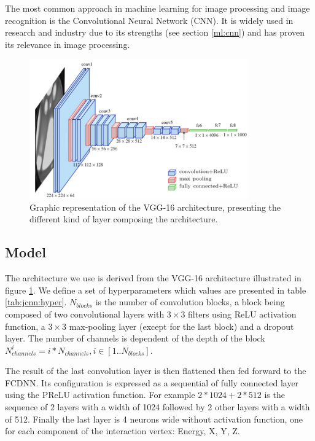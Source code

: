 The most common approach in machine learning for image processing and image recognition is the Convolutional Neural Network (CNN). It is widely used in research and industry \cite{simonyan_very_2015, ciresan_multi-column_2012, abbasi_convolutional_2021, maksimovic_cnns_2021} due to its strengths (see section \ref{ml:cnn}) and has proven its relevance in image processing.

\begin{figure}[ht]
  \centering
  \includegraphics[height=6cm]{images/jcnn/vgg16.png}
  \caption{Graphic representation of the VGG-16 architecture, presenting the different kind of layer composing the architecture.}
  \label{fig:jcnn:vgg16}
\end{figure}

\subsection{Model}
\label{sec:jcnn:model}

The architecture we use is derived from the VGG-16 architecture \cite{simonyan_very_2015} illustrated in figure \ref{fig:jcnn:vgg16}. We define a set of hyperparameters which values are presented in table \ref{tab:jcnn:hyper}. $N_{blocks}$ is the number of convolution blocks, a block being composed of two convolutional layers with $3\times3$ filters using ReLU activation function, a $3\times3$ max-pooling layer (except for the last block) and a dropout layer. The number of channels is dependent of the depth of the block $N^i_{channels} = i * N_{channels}, i \in [1..N_{blocks}]$.

The result of the last convolution layer is then flattened then fed forward to the FCDNN. Its configuration is expressed as a sequential of fully connected layer using the PReLU activation function. For example $2 * 1024 + 2 * 512$ is the sequence of 2 layers with a width of 1024 followed by 2 other layers with a width of 512. Finally the last layer is 4 neurons wide without activation function, one for each component of the interaction vertex: Energy, X, Y, Z.


